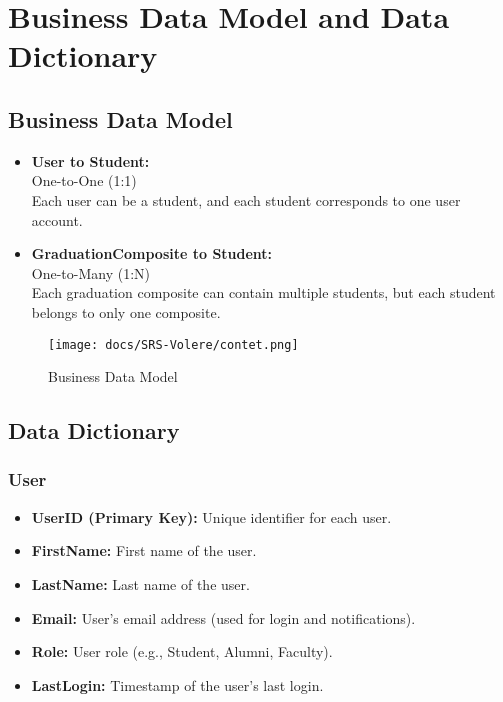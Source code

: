 \documentclass[12pt]{article}
\begin{document}
\section{Business Data Model and Data Dictionary}

\subsection{Business Data Model}

\begin{itemize}
  \item \textbf{User to Student:} \\
  One-to-One (1:1) \\
  Each user can be a student, and each student corresponds to one user account.

  \item \textbf{GraduationComposite to Student:} \\
  One-to-Many (1:N) \\
  Each graduation composite can contain multiple students, but each student belongs to only one composite.
\end{itemize}

\begin{figure} %
    \centering
    \texttt{[image: docs/SRS-Volere/contet.png]}
    \caption{Business Data Model}
    \label{fig:your-label}
\end{figure}
\pagebreak

\subsection{Data Dictionary}

\subsubsection*{User}
\begin{itemize}
  \item \textbf{UserID (Primary Key):} Unique identifier for each user.
  \item \textbf{FirstName:} First name of the user.
  \item \textbf{LastName:} Last name of the user.
  \item \textbf{Email:} User's email address (used for login and notifications).
  \item \textbf{Role:} User role (e.g., Student, Alumni, Faculty).
  \item \textbf{LastLogin:} Timestamp of the user's last login.
\end{itemize}
\end{document}
